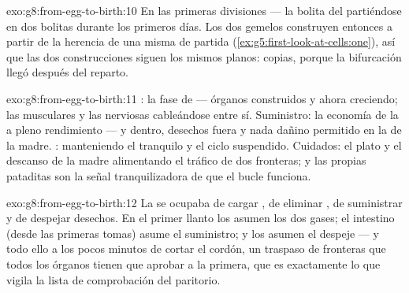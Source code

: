\begin{solution}{exo:g8:from-egg-to-birth:10}
En las primeras divisiones --- la bolita del  partiéndose en dos
bolitas durante los primeros días. Los dos gemelos construyen entonces
a partir de la herencia de una misma  de partida
(\cref{ex:g5:first-look-at-cells:one}), así que las dos construcciones
siguen los mismos planos: copias, porque la bifurcación llegó después
del reparto.
\end{solution}

\begin{solution}{exo:g8:from-egg-to-birth:11}
: la fase de  --- órganos construidos y ahora creciendo; las
 musculares y las nerviosas cableándose entre sí. Suministro: la
economía de la  a pleno rendimiento ---  y 
dentro, desechos fuera y nada dañino permitido en la  de la
madre. : manteniendo el  tranquilo y el ciclo suspendido.
Cuidados: el plato y el descanso de la madre alimentando el tráfico de
dos fronteras; y las propias pataditas son la señal tranquilizadora de
que el bucle funciona.
\end{solution}

\begin{solution}{exo:g8:from-egg-to-birth:12}
La  se ocupaba de cargar , de eliminar , de suministrar  y de despejar desechos. En el primer
llanto los  asumen los dos gases; el intestino (desde las
primeras tomas) asume el suministro; y los  asumen el despeje
--- y todo ello a los pocos minutos de cortar el cordón, un traspaso de
fronteras que todos los órganos tienen que aprobar a la primera, que es
exactamente lo que vigila la lista de comprobación del paritorio.
\end{solution}

